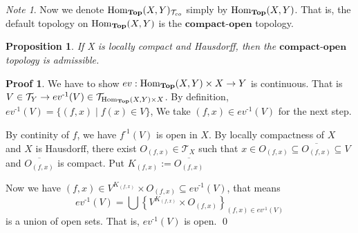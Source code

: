 \documentclass[a4paper]{article}
\theoremstyle{plain}
\newtheorem{prop}[thm]{Proposition}
\theoremstyle{definition}
\newtheorem*{prf}{Proof}
\theoremstyle{remark}
\newtheorem*{note}{Note}
\newcommand{\mc}[1]{\mathcal{#1}}
\newcommand{\mbf}[1]{\mathbf{#1}}
\newcommand{\mcT}{\mc T}
\newcommand{\ol}[1]{\overline{#1}}
\newcommand{\inv}[1]{#1^{\text{-}1}}
\DeclareMathOperator{\Homtop}{\rm{Hom}_{\mbf{Top}}}
\begin{document}
    \begin{note}
        Now we denote $\Homtop(X,Y)_{\mcT_{co}}$ simply by $\Homtop(X,Y)$.
        That is, the default topology on $\Homtop(X,Y)$ is the $\mbf{compact\text{-}open}$ topology.
    \end{note}

    \begin{prop}
        If X is locally compact and Hausdorff, then the $\mbf{compact\text{-}open}$
        topology is admissible.
    \end{prop}
    \begin{prf}
        We have to show $ev : \Homtop(X,Y) \times X \to Y$ is continuous.
        That is $V \in \mcT_Y \to \inv{ev}(V) \in \mcT_{\Homtop(X,Y) \times X }$.
        By definition, $\inv{ev}(V) = \{ (f,x) \mid f(x) \in V \}$,
        We take $(f,x) \in \inv{ev}(V)$ for the next step.
        \par  By continity of $f$, we have $\inv{f} (V)$ is open in $X$.
        By locally compactness of $X$ and $X$ is Hausdorff, there exist
        $ O_{(f,x)} \in \mcT_X$ such that $x \in O_{(f,x)} \subseteq \ol{O_{(f,x)}} \subseteq V$
        and $\ol{O_{(f,x)}}$ is compact. Put $K_{(f,x)} := \ol{O_{(f,x)}}$
        \par Now we have $(f,x) \in V^{K_{(f,x)}} \times O_{(f,x)} \subseteq \inv{ev}(V)$, that means
        $$ \inv{ev}(V) = \bigcup \left\{ V^{K_{(f,x)}} \times O_{(f,x)} \right\}_{(f,x) \in \inv{ev}(V)} $$ 
        is a union of open sets. That is, $\inv{ev}(V)$ is open.
        \qed
    \end{prf}
    
    
\end{document}
